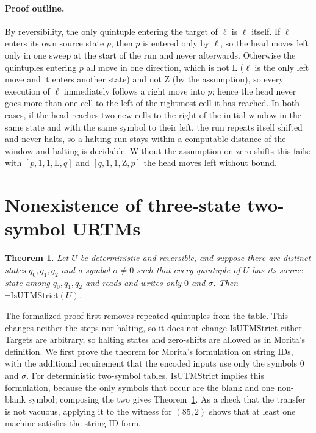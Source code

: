 \documentclass{article}
\newtheorem{theorem}{Theorem}
\theoremstyle{definition}
\theoremstyle{remark}
\newcommand{\rmL}{\mathrm{L}}
\newcommand{\rmZ}{\mathrm{Z}}
\begin{document}
\paragraph{Proof outline.}
By reversibility, the only quintuple entering the target of $\ell$ is $\ell$ itself.
If $\ell$ enters its own source state $p$, then $p$ is entered only by $\ell$, so the head moves left only in one sweep at the start of the run and never afterwards.
Otherwise the quintuples entering $p$ all move in one direction, which is not L ($\ell$ is the only left move and it enters another state) and not Z (by the assumption), so every execution of $\ell$ immediately follows a right move into $p$; hence the head never goes more than one cell to the left of the rightmost cell it has reached.
In both cases, if the head reaches two new cells to the right of the initial window in the same state and with the same symbol to their left, the run repeats itself shifted and never halts, so a halting run stays within a computable distance of the window and halting is decidable.
Without the assumption on zero-shifts this fails: with $[p,1,1,\rmL,q]$ and $[q,1,1,\rmZ,p]$ the head moves left without bound.

\section{Nonexistence of three-state two-symbol URTMs}
\label{sec:threetwo}

\begin{theorem}
\label{thm:threetwo}
Let $U$ be deterministic and reversible, and suppose there are distinct states $q_0,q_1,q_2$ and a symbol $\sigma\ne 0$ such that every quintuple of $U$ has its source state among $q_0,q_1,q_2$ and reads and writes only $0$ and $\sigma$.
Then $\neg\mathrm{IsUTMStrict}(U)$.
\end{theorem}

The formalized proof first removes repeated quintuples from the table. This changes neither the steps nor halting, so it does not change $\mathrm{IsUTMStrict}$ either.
Targets are arbitrary, so halting states and zero-shifts are allowed as in Morita's definition.
We first prove the theorem for Morita's formulation on string IDs, with the additional requirement that the encoded inputs use only the symbols $0$ and $\sigma$.
For deterministic two-symbol tables, $\mathrm{IsUTMStrict}$ implies this formulation, because the only symbols that occur are the blank and one non-blank symbol; composing the two gives Theorem~\ref{thm:threetwo}.
As a check that the transfer is not vacuous, applying it to the witness for $(85,2)$ shows that at least one machine satisfies the string-ID form.
\end{document}
